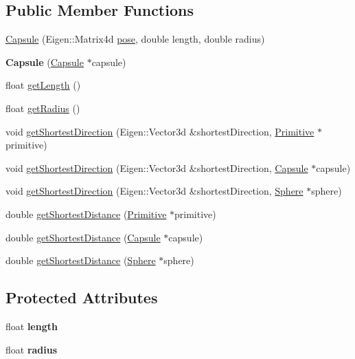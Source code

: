 \subsection*{Public Member Functions}
\begin{DoxyCompactItemize}
\item 
\hyperlink{class_capsule_aab6d0827aa8179c3f258129161a67e2e}{Capsule} (Eigen\+::\+Matrix4d \hyperlink{class_primitive_ad8b2afbad412f6046783d155c88fe312}{pose}, double length, double radius)
\item 
{\bfseries Capsule} (\hyperlink{class_capsule}{Capsule} $\ast$capsule)\hypertarget{class_capsule_a94838c4642111c07dbf83fdc775d1a68}{}\label{class_capsule_a94838c4642111c07dbf83fdc775d1a68}

\item 
float \hyperlink{class_capsule_a8ff7a408a608ee32dea8c187fce5dbea}{get\+Length} ()
\item 
float \hyperlink{class_capsule_a4e98e8545ea57fe682c5a2002bd49bdb}{get\+Radius} ()
\item 
void \hyperlink{class_capsule_ad569eae23b91f33e145f06745739e428}{get\+Shortest\+Direction} (Eigen\+::\+Vector3d \&shortest\+Direction, \hyperlink{class_primitive}{Primitive} $\ast$primitive)
\item 
void \hyperlink{class_capsule_a28274c18ef5a3b9ef869caa64d5f7d5e}{get\+Shortest\+Direction} (Eigen\+::\+Vector3d \&shortest\+Direction, \hyperlink{class_capsule}{Capsule} $\ast$capsule)
\item 
void \hyperlink{class_capsule_aae076a389170bd6644f479bfe9c243bc}{get\+Shortest\+Direction} (Eigen\+::\+Vector3d \&shortest\+Direction, \hyperlink{class_sphere}{Sphere} $\ast$sphere)
\item 
double \hyperlink{class_capsule_a43bcc7bb95425a4559f7fd0289ef8b45}{get\+Shortest\+Distance} (\hyperlink{class_primitive}{Primitive} $\ast$primitive)
\item 
double \hyperlink{class_capsule_ade8880442a9230f893c296f0681ae9ad}{get\+Shortest\+Distance} (\hyperlink{class_capsule}{Capsule} $\ast$capsule)
\item 
double \hyperlink{class_capsule_a71d7821f3e7f9ac972bceb06d82f529d}{get\+Shortest\+Distance} (\hyperlink{class_sphere}{Sphere} $\ast$sphere)
\end{DoxyCompactItemize}
\subsection*{Protected Attributes}
\begin{DoxyCompactItemize}
\item 
float {\bfseries length}\hypertarget{class_capsule_af62f20ecfc37b4c8ae88dd505ca1f196}{}\label{class_capsule_af62f20ecfc37b4c8ae88dd505ca1f196}

\item 
float {\bfseries radius}\hypertarget{class_capsule_a9b7e591748a2b735b35d99a2d7792f39}{}\label{class_capsule_a9b7e591748a2b735b35d99a2d7792f39}

\end{DoxyCompactItemize}
